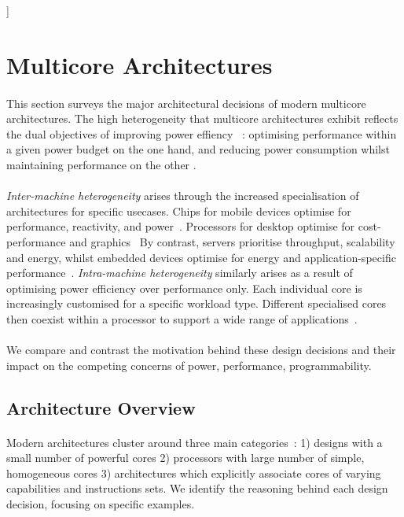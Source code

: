 ]
\section{Multicore Architectures}
\paragraph{}  This section surveys the major architectural decisions of modern multicore 
architectures. The high heterogeneity that multicore architectures exhibit
reflects the dual objectives of improving power effiency ~\cite{borkar2011futuremicroprocessors}:
optimising performance within a given power budget on the one hand, 
and reducing power consumption whilst maintaining performance on the other .



\paragraph{} \emph{Inter-machine heterogeneity} arises through the
increased specialisation of architectures for specific usecases. Chips for
mobile devices optimise for performance, reactivity, and power~\cite{hennessy2006comparchquantitative}.
Processors for desktop optimise for cost-performance and graphics~\cite{hennessy2006comparchquantitative}
By contrast, servers prioritise throughput, scalability and energy,
whilst embedded devices optimise for energy and application-specific
performance~\cite{hennessy2006comparchquantitative}. \emph {Intra-machine heterogeneity}  similarly arises as a result of optimising power efficiency over 
performance only. Each individual core is increasingly customised
for a specific workload type. Different specialised cores then coexist within
a processor to support a wide range of applications~\cite{5695539,balakrishnan2005impactperfasym}. 

\paragraph{} We compare and contrast the motivation behind these
design decisions and their impact on the competing
concerns of power, performance, programmability.

\subsection{Architecture Overview}

\paragraph{} Modern architectures cluster around three main categories~\cite{Vajda:1414193}: 1) designs with a small number of powerful cores 2) processors with large number of simple, homogeneous cores 3) architectures which explicitly associate cores of varying capabilities and instructions sets. We identify the
reasoning behind each design decision, focusing on specific examples.


